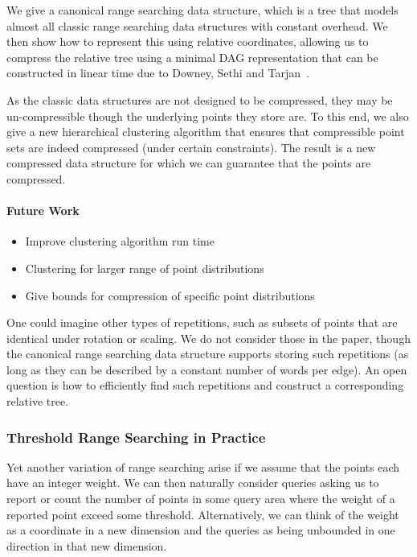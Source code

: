 We give a canonical range searching data structure, which is a tree that models almost all classic range searching data structures with constant overhead. We then show how to represent this using relative coordinates, allowing us to compress the relative tree using a minimal DAG representation that can be constructed in linear time due to Downey, Sethi and Tarjan~\cite{downey1980variations}.

As the classic data structures are not designed to be compressed, they may be un-compressible though the underlying points they store are. 
To this end, we also give a new hierarchical clustering algorithm that ensures that compressible point sets are indeed compressed (under certain constraints). The result is a new compressed data structure for which we can guarantee that the points are compressed.

\paragraph{Future Work}
\begin{itemize}
    \item Improve clustering algorithm run time
    \item Clustering for larger range of point distributions
    \item Give bounds for compression of specific point distributions
\end{itemize}
One could imagine other types of repetitions, such as subsets of points that are identical under rotation or scaling. We do not consider those in the paper, though the canonical range searching data structure supports storing such repetitions (as long as they can be described by a constant number of words per edge). An open question is how to efficiently find such repetitions and construct a corresponding relative tree.

\clearpage
\subsubsection{Threshold Range Searching in Practice}
Yet another variation of range searching arise if we assume that the points each have an integer weight. We can then naturally consider queries asking us to report or count the number of points in some query area where the weight of a reported point exceed some threshold. 
Alternatively, we can think of the weight as a coordinate in a new dimension and the queries as being unbounded in one direction in that new dimension.

